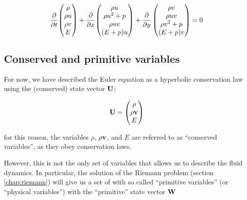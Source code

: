 \begin{align}
	\frac{\partial}{\partial t}{ 
		\begin{pmatrix}
			\rho \\ \rho u \\ \rho v \\ E
		\end{pmatrix}
		}
	+ \frac{\partial}{\partial x} {
		\begin{pmatrix}
			\rho u\\
			\rho u^2  + p\\
			\rho uv\\
			(E + p) u
		\end{pmatrix}
	} 
	+ \frac{\partial}{\partial y}
		\begin{pmatrix}
			\rho v\\
			\rho uv\\
			\rho v^2  + p\\
			(E + p) v
		\end{pmatrix}
	= 0
\end{align}















\subsection{Conserved and primitive variables}


For now, we have described the Euler equation as a hyperbolic conservation law using the (conserved) state vector $\mathbf{U}$:

\begin{align}
	\mathbf{U} = 
		\begin{pmatrix}
			\rho \\ \rho \mathbf{v} \\ E
		\end{pmatrix}
\end{align}


for this reason, the variables $\rho$, $\rho \mathbf{v}$, and $E$ are referred to as ``conserved variables'', as they obey conservation laws.

However, this is not the only set of variables that allows us to describe the fluid dynamics.
In particular, the solution of the  Riemann problem (section \ref{chap:riemann}) will give us a set of with so called ``primitive variables'' (or ``physical variables'') with the ``primitive'' state vector $\mathbf{W}$

